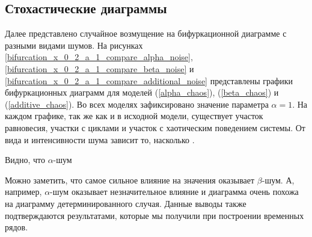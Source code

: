 \subsection{Стохастические диаграммы}

    Далее представлено случайное возмущение на бифуркационной диаграмме с разными видами шумов. На рисунках \ref{bifurcation_x_0_2_a_1_compare_alpha_noise}, \ref{bifurcation_x_0_2_a_1_compare_beta_noise} и \ref{bifurcation_x_0_2_a_1_compare_additional_noise} представлены графики бифуркационных диаграмм для моделей (\ref{alpha_chaos}), (\ref{beta_chaos}) и (\ref{additive_chaos}). Во всех моделях зафиксировано значение параметра \(\alpha = 1\). На каждом графике, так же как и в исходной модели, существует участок равновесия, участки с циклами и участок с хаотическим поведением системы. От вида и интенсивности шума зависит то, насколько .

    Видно, что \(\alpha\)-шум 

    Можно заметить, что самое сильное влияние на значения оказывает \(\beta\)-шум. А, например, \(\alpha\)-шум оказывает незначительное влияние и диаграмма очень похожа на диаграмму детерминированного случая. Данные выводы также подтверждаются результатами, которые мы получили при построении временных рядов.

